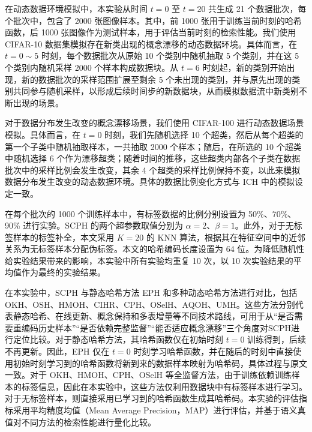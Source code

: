 在动态数据环境模拟中，本实验从时间 $t=0$ 至 $t=20$ 共生成 21 个数据批次，每个批次中，包含了 2000 张图像样本。其中，前 1000 张用于训练当前时刻的哈希函数，后 1000 张图像作为测试样本，用于评估当前时刻的检索性能。我们使用 CIFAR-10 数据集模拟存在新类出现的概念漂移的动态数据环境。具体而言，在 $t=0 \sim 5$ 时刻，每个数据批次从原始 10 个类别中随机抽取 5 个类别，并在这 5 个类别内随机采样 2000 个样本构成数据块。从 $t=6$ 时刻起，新的类别开始出现，新的数据批次的采样范围扩展至剩余 5 个未出现的类别，并与原先出现的类别共同参与随机采样，以形成后续时间步的新数据块，从而模拟数据流中新类别不断出现的场景。

对于数据分布发生改变的概念漂移场景，我们使用 CIFAR-100 进行动态数据场景模拟。具体而言，在 $t=0$ 时刻，我们先随机选择 10 个超类，然后从每个超类的第一个子类中随机抽取样本，一共抽取 2000 个样本；随后，在所选的 10 个超类中随机选择 6 个作为漂移超类；随着时间的推移，这些超类内部各个子类在数据批次中的采样比例会发生改变，其余 4 个超类的采样比例保持不变，以此来模拟数据分布发生改变的动态数据环境。具体的数据比例变化方式与 ICH 中的模拟设定一致。

在每个批次的 1000 个训练样本中，有标签数据的比例分别设置为 50\%、70\%、90\% 进行实验。SCPH 的两个超参数取值分别为 $\alpha=2$、$\beta=1$。此外，对于无标签样本的标签补全，本文采用 $K=20$ 的 KNN 算法，根据其在特征空间中的近邻关系为无标签样本分配伪标签。本文的哈希编码长度设置为 64 位。为降低随机性给实验结果带来的影响，本实验中所有实验均重复 10 次，以 10 次实验结果的平均值作为最终的实验结果。

在本实验中，SCPH 与静态哈希方法 EPH 和多种动态哈希方法进行对比，包括 OKH、OSH、HMOH、CIHR、CPH、OSelH、AQOH、UMH。这些方法分别代表静态哈希、在线更新、概念保持和多表增量等不同技术路线，可用于从“是否需要重编码历史样本”“是否依赖完整监督”“能否适应概念漂移”三个角度对SCPH进行定位比较。对于静态哈希方法，其哈希函数仅在初始时刻 $t=0$ 训练得到，后续不再更新。因此，EPH 仅在 $t=0$ 时刻学习哈希函数，并在随后的时刻中直接使用初始时刻学习到的哈希函数将新到来的数据样本映射为哈希码，具体过程与原文一致。对于 OKH、HMOH、CPH、OSelH 等全监督方法，由于训练依赖训练样本的标签信息，因此在本实验中，这些方法仅利用数据块中有标签样本进行学习。对于无标签样本，则直接采用已学习到的哈希函数生成其哈希码。本实验的评估指标采用平均精度均值（Mean Average Precision，MAP）进行评估，并基于语义真值对不同方法的检索性能进行量化比较。

